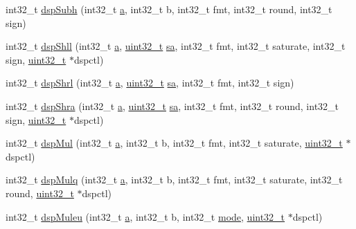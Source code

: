 \begin{DoxyCompactItemize}
int32\_\-t \hyperlink{namespaceMipsISA_ae22415bc9fdff6776d8b6d96a0dbea4e}{dspSubh} (int32\_\-t \hyperlink{namespaceMipsISA_ad15ace88a723e43c4e98c8c646891e79}{a}, int32\_\-t b, int32\_\-t fmt, int32\_\-t round, int32\_\-t sign)
\item 
int32\_\-t \hyperlink{namespaceMipsISA_a68ada9e81042546a67dd29c6a65ce5c3}{dspShll} (int32\_\-t \hyperlink{namespaceMipsISA_ad15ace88a723e43c4e98c8c646891e79}{a}, \hyperlink{Type_8hh_a435d1572bf3f880d55459d9805097f62}{uint32\_\-t} \hyperlink{namespaceMipsISA_ac5212d09029b84b4ed4df34dd739329a}{sa}, int32\_\-t fmt, int32\_\-t saturate, int32\_\-t sign, \hyperlink{Type_8hh_a435d1572bf3f880d55459d9805097f62}{uint32\_\-t} $\ast$dspctl)
\item 
int32\_\-t \hyperlink{namespaceMipsISA_a3a5769efff7a137e7cc0bbbfa2eb8d74}{dspShrl} (int32\_\-t \hyperlink{namespaceMipsISA_ad15ace88a723e43c4e98c8c646891e79}{a}, \hyperlink{Type_8hh_a435d1572bf3f880d55459d9805097f62}{uint32\_\-t} \hyperlink{namespaceMipsISA_ac5212d09029b84b4ed4df34dd739329a}{sa}, int32\_\-t fmt, int32\_\-t sign)
\item 
int32\_\-t \hyperlink{namespaceMipsISA_a4664f70ef32674a9d5794fd932ce58bd}{dspShra} (int32\_\-t \hyperlink{namespaceMipsISA_ad15ace88a723e43c4e98c8c646891e79}{a}, \hyperlink{Type_8hh_a435d1572bf3f880d55459d9805097f62}{uint32\_\-t} \hyperlink{namespaceMipsISA_ac5212d09029b84b4ed4df34dd739329a}{sa}, int32\_\-t fmt, int32\_\-t round, int32\_\-t sign, \hyperlink{Type_8hh_a435d1572bf3f880d55459d9805097f62}{uint32\_\-t} $\ast$dspctl)
\item 
int32\_\-t \hyperlink{namespaceMipsISA_a6b76ad8042f64cf6a93b1b6b8ec59d46}{dspMul} (int32\_\-t \hyperlink{namespaceMipsISA_ad15ace88a723e43c4e98c8c646891e79}{a}, int32\_\-t b, int32\_\-t fmt, int32\_\-t saturate, \hyperlink{Type_8hh_a435d1572bf3f880d55459d9805097f62}{uint32\_\-t} $\ast$dspctl)
\item 
int32\_\-t \hyperlink{namespaceMipsISA_a3006e33638ef226180920245f581d7a2}{dspMulq} (int32\_\-t \hyperlink{namespaceMipsISA_ad15ace88a723e43c4e98c8c646891e79}{a}, int32\_\-t b, int32\_\-t fmt, int32\_\-t saturate, int32\_\-t round, \hyperlink{Type_8hh_a435d1572bf3f880d55459d9805097f62}{uint32\_\-t} $\ast$dspctl)
\item 
int32\_\-t \hyperlink{namespaceMipsISA_ad49f6da026197c52744cb3aa8fea0d39}{dspMuleu} (int32\_\-t \hyperlink{namespaceMipsISA_ad15ace88a723e43c4e98c8c646891e79}{a}, int32\_\-t b, int32\_\-t \hyperlink{namespaceMipsISA_ae317cde5969f1a58116b73ae0d8adec0}{mode}, \hyperlink{Type_8hh_a435d1572bf3f880d55459d9805097f62}{uint32\_\-t} $\ast$dspctl)

\end{DoxyCompactItemize}
